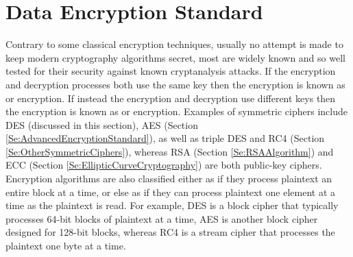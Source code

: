 
\section{Data Encryption Standard}\label{Se:DataEncryptionStandard}

Contrary to some classical encryption techniques, usually no attempt is made to
keep modern cryptography algorithms secret, most are widely known and so
well tested for their security against known cryptanalysis attacks.
If the encryption and decryption processes both use the same key then the
encryption is known as  or  encryption.
If instead the encryption and decryption use different keys then the
encryption is known as  or  encryption.
Examples of symmetric ciphers include DES
(discussed in this section),
AES (Section \ref{Se:AdvancedEncryptionStandard}),
as well as triple DES and RC4 (Section \ref{Se:OtherSymmetricCiphers}),
whereas RSA (Section \ref{Se:RSAAlgorithm}) and
ECC (Section \ref{Se:EllipticCurveCryptography}) are both public-key ciphers.
Encryption algorithms are also classified either as 
if they process plaintext an entire block at a time, or else as 
if they can process plaintext one element at a time as the plaintext is read.
For example, DES is a block cipher that typically processes 64-bit blocks of plaintext
at a time, AES is another block cipher designed for 128-bit blocks, whereas
RC4 is a stream cipher that processes the plaintext one byte at a time.

